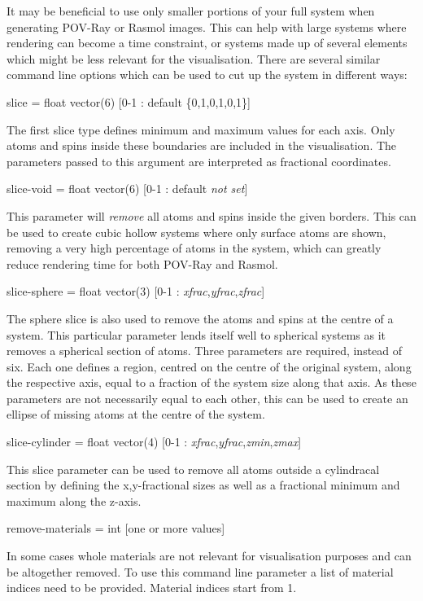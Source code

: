 It may be beneficial to use only smaller portions of your full system when generating POV-Ray or Rasmol images. This can help with large systems where rendering can become a time constraint, or systems made up of several elements which might be less relevant for the visualisation. There are several similar command line options which can be used to cut up the system in different ways:

{\zicf slice = float vector(6) [0-1 : default \{0,1,0,1,0,1\}]} The first slice type defines minimum and maximum values for each axis. Only atoms and spins inside these boundaries are included in the visualisation. The parameters passed to this argument are interpreted as fractional coordinates.

{\zicf slice-void = float vector(6) [0-1 : default \textit{not set}]} This parameter will \textit{remove} all atoms and spins inside the given borders. This can be used to create cubic hollow systems where only surface atoms are shown,  removing a very high percentage of atoms in the system, which can greatly reduce rendering time for both POV-Ray and Rasmol. 

{\zicf slice-sphere = float vector(3) [0-1 : \textit{xfrac},\textit{yfrac},\textit{zfrac}]} The sphere slice is also used to remove the atoms and spins at the centre of a system. This particular parameter lends itself well to spherical systems as it removes a spherical section of atoms. Three parameters are required, instead of six. Each one defines a region, centred on the centre of the original system, along the respective axis, equal to a fraction of the system size along that axis. As these parameters are not necessarily equal to each other, this can be used to create an ellipse of missing atoms at the centre of the system.

{\zicf slice-cylinder = float vector(4) [0-1 : \textit{xfrac},\textit{yfrac},\textit{zmin},\textit{zmax}]} This slice parameter can be used to remove all atoms outside a cylindracal section by defining the x,y-fractional sizes as well as a fractional minimum and maximum along the z-axis.

{\zicf remove-materials = int [one or more values] } In some cases whole materials are not relevant for visualisation purposes and can be altogether removed. To use this command line parameter a list of material indices need to be provided. Material indices start from 1.

